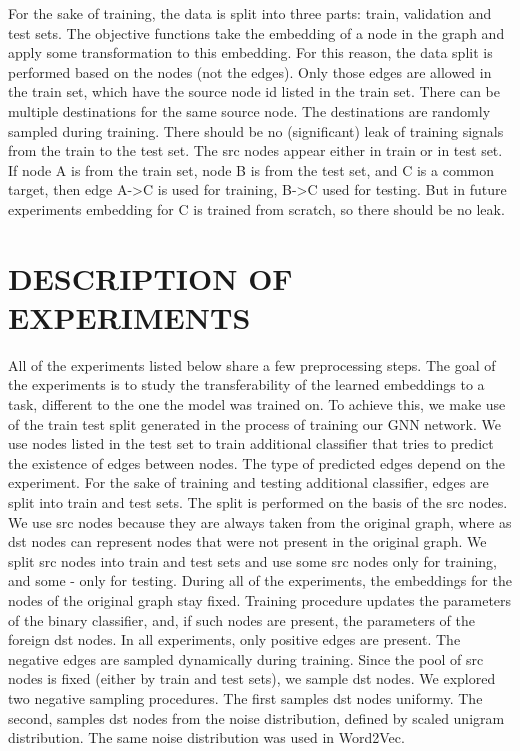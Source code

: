 \documentclass[a4paper,twoside]{article}
\begin{document}
For the sake of training, the data is split into three parts: train, validation and test sets. The objective functions take the embedding of a node in the graph and apply some transformation to this embedding. For this reason, the data split is performed based on the nodes (not the edges). Only those edges are allowed in the train set, which have the source node id listed in the train set. There can be multiple destinations for the same source node. The destinations are randomly sampled during training. 
There should be no (significant) leak of training signals from the train to the test set. The src nodes appear either in train or in test set. If node A is from the train set, node B is from the test set, and C is a common target, then edge A->C is used for training, B->C used for testing. But in future experiments embedding for C is trained from scratch, so there should be no leak.

\section{\uppercase{Description of experiments}}

All of the experiments listed below share a few preprocessing steps. The goal of the experiments is to study the transferability of the learned embeddings to a task, different to the one the model was trained on. To achieve this, we make use of the train test split generated in the process of training our GNN network. We use nodes listed in the test set to train additional classifier that tries to predict the existence of edges between nodes. The type of predicted edges depend on the experiment. 
For the sake of training and testing additional classifier, edges are split into train and test sets. The split is performed on the basis of the src nodes. We use src nodes because they are always taken from the original graph, where as dst nodes can represent nodes that were not present in the original graph. We split src nodes into train and test sets and use some src nodes only for training, and some - only for testing. During all of the experiments, the embeddings for the nodes of the original graph stay fixed. Training procedure updates the parameters of the binary classifier, and, if such nodes are present, the parameters of the foreign dst nodes. 
In all experiments, only positive edges are present. The negative edges are sampled dynamically during training. Since the pool of src nodes is fixed (either by train and test sets), we sample dst nodes. We explored two negative sampling procedures. The first samples dst nodes uniformy. The second, samples dst nodes from the noise distribution, defined by scaled unigram distribution. The same noise distribution was used in Word2Vec.
\end{document}
